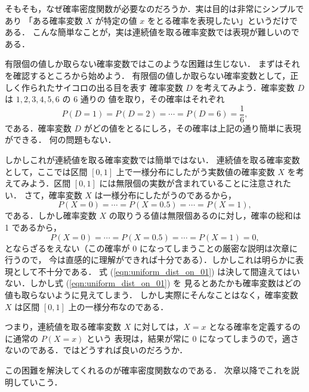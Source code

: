 

そもそも，なぜ確率密度関数が必要なのだろうか．実は目的は非常にシンプルであり
「ある確率変数 $X$ が特定の値 $x$ をとる確率を表現したい」というだけである．
こんな簡単なことが，実は連続値を取る確率変数では表現が難しいのである．

有限個の値しか取らない確率変数ではこのような困難は生じない．
まずはそれを確認するところから始めよう．
有限個の値しか取らない確率変数として，正しく作られたサイコロの出る目を表す
確率変数 $D$ を考えてみよう．確率変数 $D$ は $1, 2, 3, 4, 5, 6$ の 6 通りの
値を取り，その確率はそれぞれ
\begin{equation}
    P(D = 1) = P(D = 2) = \cdots = P(D = 6) = \frac{1}{6},
\end{equation}
である．確率変数 $D$ がどの値をとるにしろ，その確率は上記の通り簡単に表現ができる．
何の問題もない．

しかしこれが連続値を取る確率変数では簡単ではない．
連続値を取る確率変数として，ここでは区間 $[0, 1]$ 上で一様分布にしたがう実数値の確率変数 $X$
を考えてみよう．区間 $[0, 1]$ には無限個の実数が含まれていることに注意されたい．
さて，確率変数 $X$ は一様分布にしたがうのであるから，
\begin{equation}
    P(X = 0) = \cdots = P(X = 0.5) = \cdots = P(X = 1),
\end{equation}
である．しかし確率変数 $X$ の取りうる値は無限個あるのに対し，確率の総和は 1 であるから，
\begin{equation}
    P(X = 0) = \cdots = P(X = 0.5) = \cdots = P(X = 1) = 0,
    \label{eqn:uniform_dist_on_01}
\end{equation}
とならざるをえない（この確率が 0 になってしまうことの厳密な説明は次章に行うので，
今は直感的に理解ができれば十分である）．しかしこれは明らかに表現として不十分である．
式 (\ref{eqn:uniform_dist_on_01}) は決して間違えてはいない．しかし式 (\ref{eqn:uniform_dist_on_01}) を
見るとあたかも確率変数はどの値も取らないように見えてしまう．
しかし実際にそんなことはなく，確率変数 $X$ は区間 $[0, 1]$ 上の一様分布なのである．

つまり，連続値を取る確率変数 $X$ に対しては，$X = x$ となる確率を定義するのに通常の $P(X = x)$ という
表現は，結果が常に 0 になってしまうので，適さないのである．ではどうすれば良いのだろうか．

この困難を解決してくれるのが確率密度関数なのである．
次章以降でこれを説明していこう．


